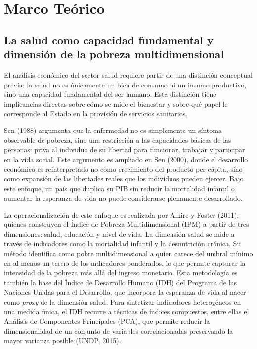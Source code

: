 \documentclass[12pt]{article}
\begin{document}

\section{Marco Teórico}

\subsection{La salud como capacidad fundamental y dimensión de la pobreza multidimensional}

El análisis económico del sector salud requiere partir de una distinción conceptual previa: la salud
no es únicamente un bien de consumo ni un insumo productivo, sino una capacidad fundamental del
ser humano. Esta distinción tiene implicancias directas sobre cómo se mide el bienestar y sobre qué
papel le corresponde al Estado en la provisión de servicios sanitarios.

Sen (1988) argumenta que la enfermedad no es simplemente un síntoma observable de pobreza,
sino una restricción a las capacidades básicas de las personas: priva al individuo de su libertad para
funcionar, trabajar y participar en la vida social. Este argumento es ampliado en Sen (2000), donde
el desarrollo económico es reinterpretado no como crecimiento del producto per cápita, sino como
expansión de las libertades reales que los individuos pueden ejercer. Bajo este enfoque, un país que
duplica su PIB sin reducir la mortalidad infantil o aumentar la esperanza de vida no puede
considerarse plenamente desarrollado.

La operacionalización de este enfoque es realizada por Alkire y Foster (2011), quienes construyen
el Índice de Pobreza Multidimensional (IPM) a partir de tres dimensiones: salud, educación y nivel
de vida. La dimensión salud se mide a través de indicadores como la mortalidad infantil y la
desnutrición crónica. Su método identifica como pobre multidimensional a quien carece del umbral
mínimo en al menos un tercio de los indicadores ponderados, lo que permite capturar la intensidad
de la pobreza más allá del ingreso monetario. Esta metodología es también la base del Índice de
Desarrollo Humano (IDH) del Programa de las Naciones Unidas para el Desarrollo, que incorpora
la esperanza de vida al nacer como \textit{proxy} de la dimensión salud. Para sintetizar indicadores
heterogéneos en una medida única, el IDH recurre a técnicas de índices compuestos, entre ellas el
Análisis de Componentes Principales (PCA), que permite reducir la dimensionalidad de un conjunto
de variables correlacionadas preservando la mayor varianza posible (UNDP, 2015).
\end{document}
